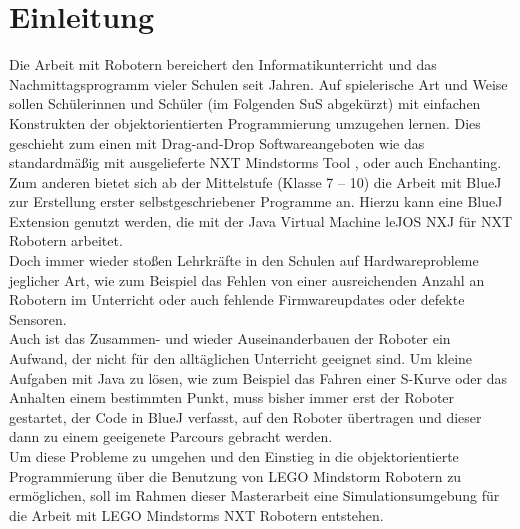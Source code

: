\documentclass[paper=a4, pagesize, DIV=calc, BCOR=12.5mm, twoside=on, onecolumn=on, open = any, titlepage =on, parskip =half-, headsepline = on, footsepline = on, chapterprefix = on, appendixprefix = off, fontsize = 12pt, numbers = noenddot, abstract = on]{scrbook}
\numberwithin{equation}{chapter}
\theoremstyle{definition}
\theoremstyle{plain}
\theoremstyle{plain}
\theoremstyle{remark}
\theoremstyle{plain}
\theoremstyle{plain}
\begin{document}
\newpage
\thispagestyle{plain}

\newcommand*\diff{\mathop{}\!\mathrm{d}}



\thispagestyle{empty}
\cleardoublepage



\newpage
\listoffigures
\newpage
\tableofcontents
\thispagestyle{empty}
\cleardoublepage
\newpage
{}
\par \singlespacing
\chapter{Einleitung}
\onehalfspacing
Die Arbeit mit Robotern bereichert den Informatikunterricht und das Nachmittagsprogramm vieler Schulen seit Jahren. Auf spielerische Art und Weise sollen Schülerinnen und Schüler (im Folgenden SuS abgekürzt) mit einfachen Konstrukten der objektorientierten Programmierung umzugehen lernen. Dies geschieht zum einen mit Drag-and-Drop Softwareangeboten wie das standardmäßig mit ausgelieferte NXT Mindstorms Tool , oder auch Enchanting.  Zum anderen bietet sich ab der Mittelstufe (Klasse 7 -- 10) die Arbeit mit BlueJ zur Erstellung erster selbstgeschriebener Programme an. Hierzu kann eine BlueJ Extension genutzt werden, die mit der Java Virtual Machine leJOS NXJ für NXT Robotern arbeitet.\\

Doch immer wieder stoßen Lehrkräfte in den Schulen auf Hardwareprobleme jeglicher Art, wie zum Beispiel das Fehlen von einer ausreichenden Anzahl an Robotern im Unterricht oder auch fehlende Firmwareupdates oder defekte Sensoren.\\
Auch ist das Zusammen- und wieder Auseinanderbauen der Roboter ein Aufwand, der nicht für den alltäglichen Unterricht geeignet sind. Um kleine Aufgaben mit Java zu lösen, wie zum Beispiel das Fahren einer S-Kurve oder das Anhalten einem bestimmten Punkt, muss bisher immer erst der Roboter gestartet, der Code in BlueJ verfasst, auf den Roboter übertragen und dieser dann zu einem geeigenete Parcours gebracht werden.\\

Um diese Probleme zu umgehen und den Einstieg in die objektorientierte Programmierung über die Benutzung von LEGO Mindstorm Robotern zu ermöglichen, soll im Rahmen dieser Masterarbeit eine Simulationsumgebung für die Arbeit mit LEGO Mindstorms NXT Robotern entstehen.
\newpage
\par\singlespacing
\end{document}
